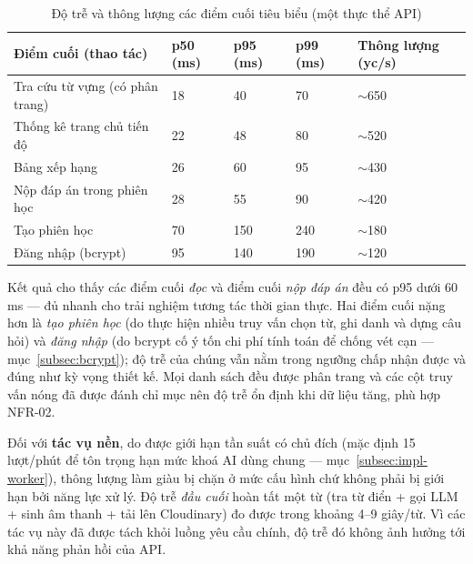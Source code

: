 \begin{table}[h]
  \centering
  \small
  \renewcommand{\arraystretch}{1.3}
  \begin{tabular}{|p{5.6cm}|p{1.6cm}|p{1.6cm}|p{1.6cm}|p{2.4cm}|}
    \hline
    \textbf{Điểm cuối (thao tác)} & \textbf{p50 (ms)} & \textbf{p95 (ms)} & \textbf{p99 (ms)} & \textbf{Thông lượng (yc/s)} \\
    \hline
    Tra cứu từ vựng (có phân trang) & 18 & 40 & 70 & $\sim$650 \\
    \hline
    Thống kê trang chủ tiến độ & 22 & 48 & 80 & $\sim$520 \\
    \hline
    Bảng xếp hạng & 26 & 60 & 95 & $\sim$430 \\
    \hline
    Nộp đáp án trong phiên học & 28 & 55 & 90 & $\sim$420 \\
    \hline
    Tạo phiên học & 70 & 150 & 240 & $\sim$180 \\
    \hline
    Đăng nhập (bcrypt) & 95 & 140 & 190 & $\sim$120 \\
    \hline
  \end{tabular}
  \caption{Độ trễ và thông lượng các điểm cuối tiêu biểu (một thực thể API)}
  \label{tab:perf-latency}
\end{table}


Kết quả cho thấy các điểm cuối \textit{đọc} và điểm cuối \textit{nộp đáp án}
đều có p95 dưới 60\,ms --- đủ nhanh cho trải nghiệm tương tác thời gian thực.
Hai điểm cuối nặng hơn là \textit{tạo phiên học} (do thực hiện nhiều truy vấn
chọn từ, ghi danh và dựng câu hỏi) và \textit{đăng nhập} (do bcrypt cố ý tốn
chi phí tính toán để chống vét cạn --- mục~\ref{subsec:bcrypt}); độ trễ của
chúng vẫn nằm trong ngưỡng chấp nhận được và đúng như kỳ vọng thiết kế. Mọi
danh sách đều được phân trang và các cột truy vấn nóng đã được đánh chỉ mục
nên độ trễ ổn định khi dữ liệu tăng, phù hợp NFR-02.

Đối với \textbf{tác vụ nền}, do được giới hạn tần suất có chủ đích (mặc định
15 lượt/phút để tôn trọng hạn mức khoá AI dùng chung --- mục~\ref{subsec:impl-worker}),
thông lượng làm giàu bị chặn ở mức cấu hình chứ không phải bị giới hạn bởi
năng lực xử lý. Độ trễ \textit{đầu cuối} hoàn tất một từ (tra từ điển + gọi
LLM + sinh âm thanh + tải lên Cloudinary) đo được trong khoảng 4--9 giây/từ.
Vì các tác vụ này đã được tách khỏi luồng yêu cầu chính, độ trễ đó không ảnh
hưởng tới khả năng phản hồi của API.

